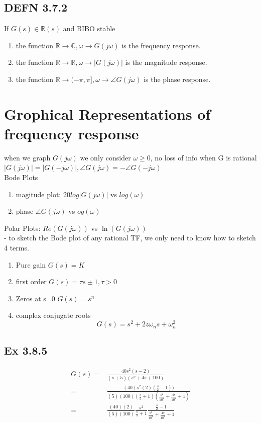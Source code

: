 \documentclass[letterpaper]{article}
\begin{document}
\subsection*{DEFN 3.7.2}
If $G(s) \in \mathbb{R}(s)$ and BIBO stable
\begin{enumerate}
	\item the function $\mathbb{R} \rightarrow \mathbb{C}, \omega\rightarrow G(j\omega)$ is the frequency response.
	\item the function $\mathbb{R} \rightarrow \mathbb{R},\omega\rightarrow|G(j\omega)|$ is the magnitude response.
	\item the function $\mathbb{R}\rightarrow (-\pi,\pi], \omega \rightarrow \angle G(j\omega)$ is the phase response.
\end{enumerate}

\section{Grophical Representations of frequency response}
when we graph $G(j\omega)$ we only consider $\omega \geq 0$, no loss of info when G is rational $|G(j\omega)|=|G(-j\omega)|, \angle G(j\omega)=-\angle G(-j\omega)$\\
Bode Plots
\begin{enumerate}
	\item magitude plot: $20log|G(j\omega)|$ vs $log(\omega)$
	\item phase $\angle G(j\omega)$ vs $og(\omega)$	
\end{enumerate}
Polar Plots: $Re(G(j\omega))$ vs $\ln(G(j\omega))$\\
- to sketch the Bode plot of any rational TF, we only need to know how to sketch 4 terms.
\begin{enumerate}
	\item Pure gain $G(s)=K$
	\item first order $G(s)=\tau s \pm 1,\tau > 0$
	\item Zeros at s=0 $G(s)=s^n$
	\item complex conjugate roots $$G(s)=s^2+2z\omega_ns+\omega_n^2$$
\end{enumerate}
\subsection*{Ex 3.8.5}
\begin{align*}
G(s)=&\frac{40s^2(s-2)}{(s+5)(s^2+4s+100)}\\
=&\frac{(40)s^2(2)(\frac{s}{2}-1))}{(5)(100)(\frac{s}{5}+1)(\frac{s^2}{10^2}+\frac{4s}{10^2}+1)}\\
=&\frac{(40)(2)}{(5)(100)}\frac{s^2}{\frac{s}{5}+1}\frac{\frac{s}{2}-1}{\frac{s^2}{10^2}+\frac{4s}{10^2}+1}
\end{align*}
\end{document}
